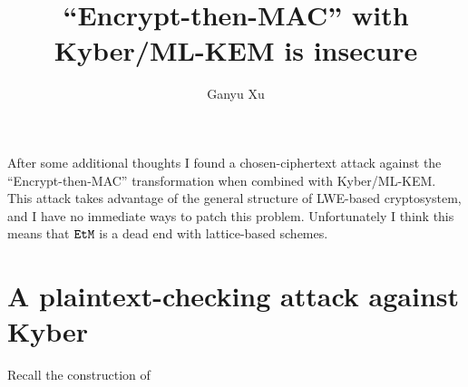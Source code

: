 \documentclass{article}
\title{
    ``Encrypt-then-MAC'' with Kyber/ML-KEM is insecure
}
\author{
    Ganyu Xu
}
\begin{document}
\maketitle

After some additional thoughts I found a chosen-ciphertext attack against the ``Encrypt-then-MAC'' transformation when combined with Kyber/ML-KEM. This attack takes advantage of the general structure of LWE-based cryptosystem, and I have no immediate ways to patch this problem. Unfortunately I think this means that $\texttt{EtM}$ is a dead end with lattice-based schemes.

\section{A plaintext-checking attack against Kyber}
Recall the construction of 
\end{document}
